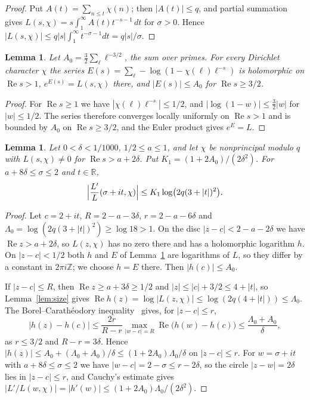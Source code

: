 \documentclass[12pt]{amsart}
\newtheorem{lemma}[theorem]{Lemma}
\theoremstyle{remark}
\renewcommand{\Re}{\operatorname{Re}}
\newcommand{\R}{\mathbb{R}}
\begin{document}
\begin{proof}
Put $A(t)=\sum_{n\le t}\chi(n)$; then $|A(t)|\le q$, and partial summation gives
$L(s,\chi)=s\int_1^\infty A(t)t^{-s-1}\,dt$ for $\sigma>0$. Hence
$|L(s,\chi)|\le q|s|\int_1^\infty t^{-\sigma-1}dt=q|s|/\sigma$.
\end{proof}

\begin{lemma}\label{lem:euler}
Let $A_0=\frac32\sum_{\ell}\ell^{-3/2}$, the sum over primes. For every Dirichlet character
$\chi$ the series $E(s)=\sum_\ell-\log(1-\chi(\ell)\ell^{-s})$ is holomorphic on $\Re s>1$,
$e^{E(s)}=L(s,\chi)$ there, and $|E(s)|\le A_0$ for $\Re s\ge3/2$.
\end{lemma}

\begin{proof}
For $\Re s\ge1$ we have $|\chi(\ell)\ell^{-s}|\le1/2$, and $|\log(1-w)|\le\frac32|w|$ for
$|w|\le1/2$. The series therefore converges locally uniformly on $\Re s>1$ and is bounded by
$A_0$ on $\Re s\ge3/2$, and the Euler product gives $e^{E}=L$.
\end{proof}

\begin{lemma}\label{lem:logderiv}
Let $0<\delta<1/1000$, $1/2\le a\le1$, and let $\chi$ be nonprincipal modulo $q$ with
$L(s,\chi)\ne0$ for $\Re s>a+2\delta$. Put $K_1=(1+2A_0)/(2\delta^2)$. For
$a+8\delta\le\sigma\le2$ and $t\in\R$,
\[
  \Bigl|\frac{L'}{L}(\sigma+it,\chi)\Bigr|\le K_1\log\bigl(2q(3+|t|)^2\bigr).
\]
\end{lemma}

\begin{proof}
Let $c=2+it$, $R=2-a-3\delta$, $r=2-a-6\delta$ and $\Lambda_0=\log(2q(3+|t|)^2)\ge\log18>1$.
On the disc $|z-c|<2-a-2\delta$ we have $\Re z>a+2\delta$, so $L(z,\chi)$ has no zero there
and has a holomorphic logarithm $h$. On $|z-c|<1/2$ both $h$ and $E$ of Lemma~\ref{lem:euler}
are logarithms of $L$, so they differ by a constant in $2\pi i\mathbb Z$; we choose $h=E$ there.
Then $|h(c)|\le A_0$.

If $|z-c|\le R$, then $\Re z\ge a+3\delta\ge1/2$ and $|z|\le|c|+3/2\le4+|t|$, so
Lemma~\ref{lem:size} gives $\Re h(z)=\log|L(z,\chi)|\le\log(2q(4+|t|))\le\Lambda_0$.
The Borel--Carath\'eodory inequality~\cite[\S5.5]{Tit39} gives, for $|z-c|\le r$,
\[
  |h(z)-h(c)|\le\frac{2r}{R-r}\max_{|w-c|=R}\Re\bigl(h(w)-h(c)\bigr)
  \le\frac{\Lambda_0+A_0}{\delta},
\]
as $r\le3/2$ and $R-r=3\delta$. Hence $|h(z)|\le A_0+(\Lambda_0+A_0)/\delta\le(1+2A_0)\Lambda_0/\delta$
on $|z-c|\le r$. For $w=\sigma+it$ with $a+8\delta\le\sigma\le2$ we have $|w-c|=2-\sigma\le r-2\delta$,
so the circle $|z-w|=2\delta$ lies in $|z-c|\le r$, and Cauchy's estimate gives
$|L'/L(w,\chi)|=|h'(w)|\le(1+2A_0)\Lambda_0/(2\delta^2)$.
\end{proof}
\end{document}
